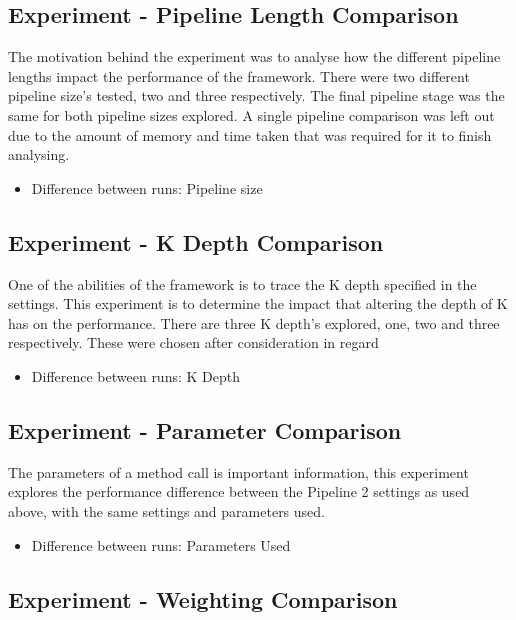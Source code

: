 \subsection{Experiment  - Pipeline Length Comparison}

The motivation behind the experiment was to analyse how the different pipeline lengths impact the performance of the framework. There were two different pipeline size's tested, two and three respectively. The final pipeline stage was the same for both pipeline sizes explored. A single pipeline comparison was left out due to the amount of memory and time taken that was required for it to finish analysing.

\begin{itemize}
\item Difference between runs: Pipeline size
\end{itemize}

\subsection{Experiment  - K Depth Comparison}

One of the abilities of the framework is to trace the K depth specified in the settings. This experiment is to determine the impact that altering the depth of K has on the performance. There are three K depth's explored, one, two and three respectively. These were chosen after consideration in regard 

\begin{itemize}
\item Difference between runs: K Depth
\end{itemize}

\subsection{Experiment  - Parameter Comparison}

The parameters of a method call is important information, this experiment explores the performance difference between the Pipeline 2 settings as used above, with the same settings and parameters used. 

\begin{itemize}
\item Difference between runs: Parameters Used
\end{itemize}

\subsection{Experiment  - Weighting Comparison}

